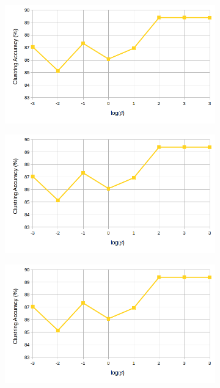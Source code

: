 \begin{figure}[!h]
\begin{subfigure}[b]{0.43\linewidth}
    \caption{}
  \end{subfigure}
    \begin{subfigure}[b]{0.43\linewidth}
    \includegraphics[width=\linewidth]{images/cluster_beta}
    \caption{}
  \end{subfigure}
    \begin{subfigure}[b]{0.43\linewidth}
    \includegraphics[width=\linewidth]{images/cluster_beta}
    \caption{}
  \end{subfigure}
    \begin{subfigure}[b]{0.43\linewidth}
    \includegraphics[width=\linewidth]{images/cluster_beta}

\end{subfigure}
\end{figure}
